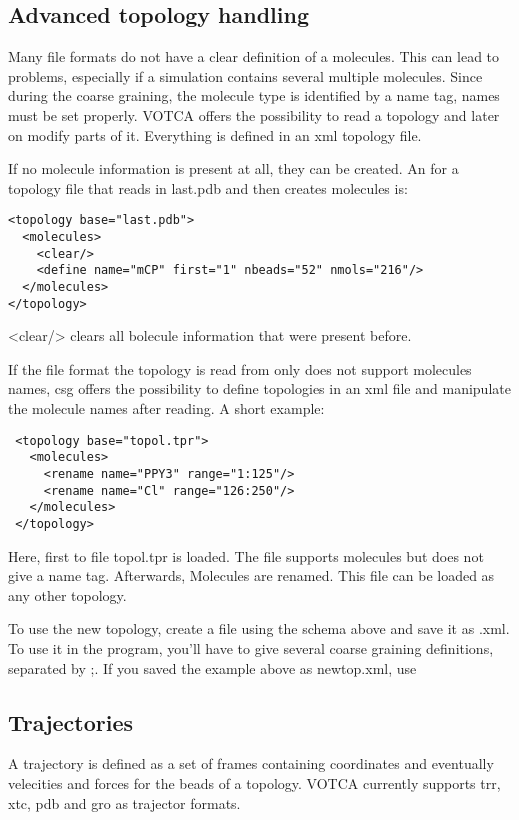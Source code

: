 \subsection{Advanced topology handling}
\label{sec:adv_topology}
Many file formats do not have a clear definition of a molecules. This can lead to problems, especially if a simulation contains several multiple molecules. Since during the coarse graining, the molecule type is identified by a name tag, names must be set properly. VOTCA offers the possibility to read a topology and later on modify parts of it. Everything is defined in an xml topology file.

If no molecule information is present at all, they can be created. An for a topology file that reads in last.pdb and then creates molecules is:
\begin{verbatim}
<topology base="last.pdb">
  <molecules>
    <clear/>
    <define name="mCP" first="1" nbeads="52" nmols="216"/>
  </molecules>
</topology>
\end{verbatim}
<clear/> clears all bolecule information that were present before.

If the file format the topology is read from only does not support molecules names, csg offers the possibility to define topologies in an xml file and manipulate the molecule names after reading. A short example:
\begin{verbatim}
 <topology base="topol.tpr">
   <molecules>
     <rename name="PPY3" range="1:125"/>
     <rename name="Cl" range="126:250"/>
   </molecules>
 </topology>
\end{verbatim}
Here, first to file topol.tpr is loaded. The file supports molecules but does not give a name tag. Afterwards, Molecules are renamed. This file can be loaded as any other topology.

To use the new topology, create a file using the schema above and save it as .xml. To use it in the program, you'll have to give several coarse graining definitions, separated by ;. If you saved the example above as newtop.xml, use 

\subsection{Trajectories}
A trajectory is defined as a set of frames containing coordinates and eventually velecities and forces for the beads of a topology.
VOTCA currently supports trr, xtc, pdb and gro as trajector formats.






